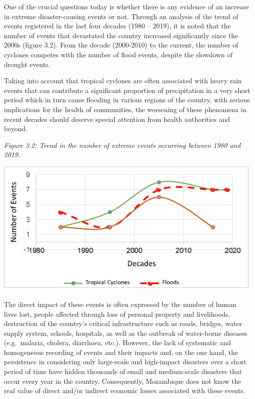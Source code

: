 \documentclass[
]{book}
\begin{document}
One of the crucial questions today is whether there is any evidence of an increase in extreme disaster-causing events or not. Through an analysis of the trend of events registered in the last four decades (1980 -- 2019), it is noted that the number of events that devastated the country increased significantly since the 2000s (figure 3.2). From the decade (2000-2010) to the current, the number of cyclones competes with the number of flood events, despite the slowdown of drought events.

Taking into account that tropical cyclones are often associated with heavy rain events that can contribute a significant proportion of precipitation in a very short period which in turn cause flooding in various regions of the country, with serious implications for the health of communities, the worsening of these phenomena in recent decades should deserve special attention from health authorities and beyond.

\emph{Figure 3.2: Trend in the number of extreme events occurring between 1980 and 2019.}

\includegraphics{Extreme-trends.png}

The direct impact of these events is often expressed by the number of human lives lost, people affected through loss of personal property and livelihoods, destruction of the country's critical infrastructure such as roads, bridges, water supply system, schools, hospitals, as well as the outbreak of water-borne diseases (e.g.~malaria, cholera, diarrhoea, etc.). However, the lack of systematic and homogeneous recording of events and their impacts and, on the one hand, the persistence in considering only large-scale and high-impact disasters over a short period of time have hidden thousands of small and medium-scale disasters that occur every year in the country. Consequently, Mozambique does not know the real value of direct and/or indirect economic losses associated with these events.
\end{document}
